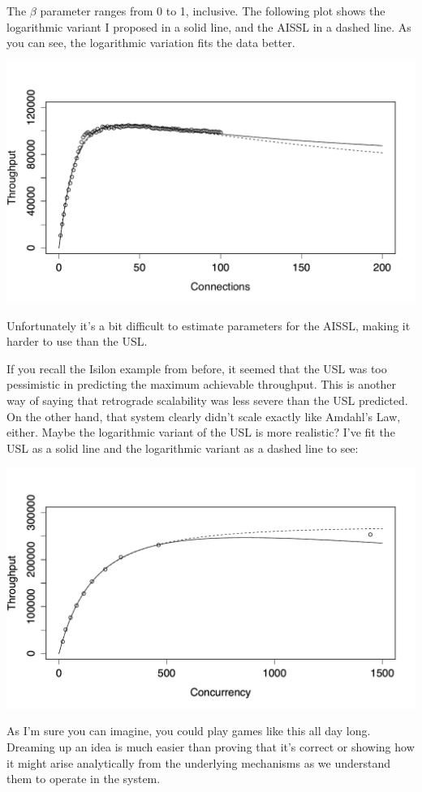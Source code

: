 \documentclass{vivid_layout}
\begin{document}
The $\beta$ parameter ranges from 0 to 1, inclusive. The following plot shows
the logarithmic variant I proposed in a solid line, and the AISSL in a dashed
line. As you can see, the logarithmic variation fits the data better.
\begin{center}
\includegraphics[width=.85\linewidth]{scalability/aissl}
\end{center}

Unfortunately it's a bit difficult to estimate parameters for the AISSL, making
it harder to use than the USL. 

If you recall the Isilon example from before, it seemed that the USL was too
pessimistic in predicting the maximum achievable throughput. This is another
way of saying that retrograde scalability was less severe than the USL
predicted. On the other hand, that system clearly didn't scale exactly like
Amdahl's Law, either. Maybe the logarithmic variant of the USL is more
realistic? I've fit the USL as a solid line and the logarithmic variant as a
dashed line to see:
\begin{center}
\includegraphics[width=.85\linewidth]{scalability/isilon-logarithmic}
\end{center}

As I'm sure you can imagine, you could play games like this all day long.
Dreaming up an idea is much easier than proving that it's correct or showing
how it might arise analytically from the underlying mechanisms as we understand
them to operate in the system.
\end{document}
